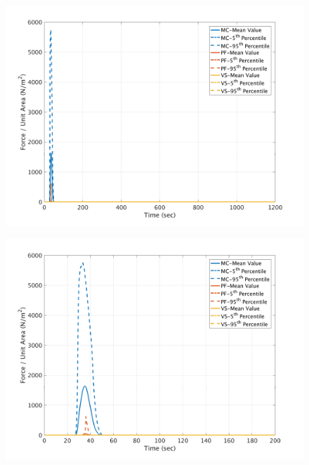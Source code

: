 \documentclass[a4paper,10pt]{article}
\begin{document}
\begin{figure}[H]
	\begin{minipage}[b]{0.5\linewidth}
	\centering
    \includegraphics[width=1\textwidth]{NetFAll/NetF7All.png}     
        \label{fig:NF7}
	\end{minipage}
	\begin{minipage}[b]{0.5\linewidth}
	\centering
    \includegraphics[width=1\textwidth]{NetFAll/NetF7All_z.png}
        \label{fig:NF7zoom}
	\end{minipage}
	

\end{figure}
\end{document}
